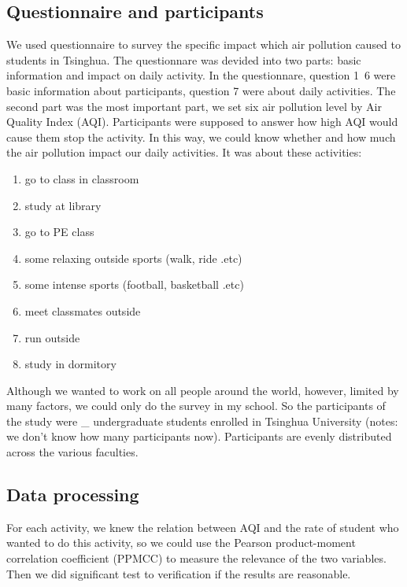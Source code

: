 \subsection{Questionnaire and participants}
We used questionnaire to survey the specific impact which air pollution caused to students in Tsinghua. The questionnare was devided into two parts: basic information and impact on daily activity. In the questionnare, question 1~6 were basic information about participants, question 7 were about daily activities. The second part was the most important part, we set six air pollution level by Air Quality Index (AQI). Participants were supposed to answer how high AQI would cause them stop the activity. In this way, we could know whether and how much the air pollution impact our daily activities. It was about these activities:

\begin{enumerate}
\item go to class in classroom
\item study at library
\item go to PE class
\item some relaxing outside sports (walk, ride .etc)
\item some intense sports (football, basketball .etc)
\item meet classmates outside
\item run outside
\item study in dormitory
\end{enumerate}

Although we wanted to work on all people around the world, however, limited by many factors, we could only do the survey in my school. So the participants of the study were \_ undergraduate students enrolled in Tsinghua University (notes: we don't know how many participants now). Participants are evenly distributed across the various faculties.

\subsection{Data processing}
For each activity, we knew the relation between AQI and the rate of student who wanted to do this activity, so we could use the Pearson product-moment correlation coefficient (PPMCC) to measure the relevance of the two variables. Then we did significant test to verification if the results are reasonable.